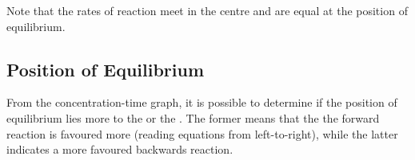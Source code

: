 				Note that the rates of reaction meet in the centre and are equal at the position of equilibrium.




		\subsection{Position of Equilibrium}

			From the concentration-time graph, it is possible to determine if the position of equilibrium lies more to the  or the
			. The former means that the the forward reaction is favoured more (reading equations from left-to-right), while the
			latter indicates a more favoured backwards reaction.


